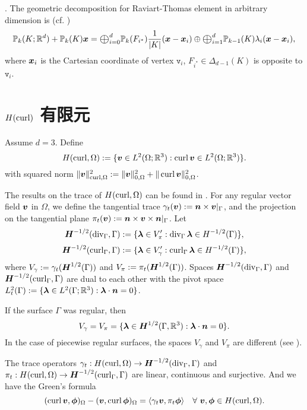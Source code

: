 .
The geometric decomposition for Raviart-Thomas element in arbitrary dimension is (cf. \cite{ArnoldFalkWinther2009})
$$
\mathbb P_k(K;\mathbb R^d)+\mathbb P_k(K)\bs x=\Oplus_{i=0}^d\mathbb P_{k}(F_{i^*})\frac{1}{|K|}(\bs x-\bs x_i) \oplus \Oplus_{i=1}^d\mathbb P_{k-1}(K)\lambda_i(\bs x-\bs x_i),
$$
where $\boldsymbol x_i$ is the Cartesian coordinate of vertex $\texttt{v}_i$, $F_{i^*}\in\Delta_{d-1}(K)$ is opposite to $\texttt{v}_i$.



\section{$H(\operatorname{curl})$ 有限元}

Assume $d=3$.
Define
\[
H(\operatorname{curl},\Omega):=\{\boldsymbol v\in L^2(\Omega;\mathbb R^3): \operatorname{curl}\boldsymbol v\in L^2(\Omega;\mathbb R^3)\}.
\]
with squared  norm $\|\boldsymbol v\|_{\operatorname{curl}, \Omega}^2:=\|\boldsymbol v\|_{0, \Omega}^2+\|\operatorname{curl}\boldsymbol v\|_{0, \Omega}^2$.

The results on the trace of $H(\operatorname{curl},\Omega)$ can be found in \cite{BuffaCostabelSheen2002,BuffaCiarlet2001,BuffaCiarlet2001a}.
 For any regular vector field $\boldsymbol v$ in $\Omega$, we define the tangential trace $\gamma_{t}(\boldsymbol v):=\boldsymbol n\times \boldsymbol v|_{\Gamma}$, and the projection on the tangential plane $\pi_{t}(\boldsymbol v):=\boldsymbol n\times\boldsymbol v\times  \boldsymbol n|_{\Gamma}$. Let
 \[
 \boldsymbol H^{-1/2}(\operatorname{div}_{\Gamma}, \Gamma):=\{\boldsymbol\lambda\in V_{\pi}': \operatorname{div}_{\Gamma}\boldsymbol\lambda\in H^{-1/2}(\Gamma)\},
 \]
 \[
 \boldsymbol H^{-1/2}(\operatorname{curl}_{\Gamma}, \Gamma):=\{\boldsymbol\lambda\in V_{\gamma}': \operatorname{curl}_{\Gamma}\boldsymbol\lambda\in H^{-1/2}(\Gamma)\},
 \]
 where $V_{\gamma}:=\gamma_{t}(\boldsymbol H^{1/2}(\Gamma))$ and $V_{\pi}:=\pi_{t}(\boldsymbol H^{1/2}(\Gamma))$.
Spaces $ \boldsymbol H^{-1/2}(\operatorname{div}_{\Gamma}, \Gamma)$ and $ \boldsymbol H^{-1/2}(\operatorname{curl}_{\Gamma}, \Gamma)$ are dual to each other with the pivot space $L_t^2(\Gamma):=\{\boldsymbol \lambda\in L^2(\Gamma;\mathbb R^3): \boldsymbol \lambda\cdot\boldsymbol n=0\}$.

If the surface $\Gamma$ was regular, then
\[
V_{\gamma}=V_{\pi}=\{\boldsymbol\lambda\in\boldsymbol H^{1/2}(\Gamma, \mathbb R^3): \boldsymbol\lambda\cdot\boldsymbol n=0\}.
\]
In the case of piecewise regular surfaces, the spaces $V_{\gamma}$ and $V_{\pi}$ are different (see \cite{BuffaCiarlet2001}).

\begin{lemma}
The trace operators $\gamma_{t}:  H(\operatorname{curl},\Omega)\to\boldsymbol H^{-1/2}(\operatorname{div}_{\Gamma}, \Gamma)$ and $\pi_{t}:  H(\operatorname{curl},\Omega)\to\boldsymbol H^{-1/2}(\operatorname{curl}_{\Gamma}, \Gamma)$ are linear, continuous and surjective. And we have the 
Green's formula
\[
(\operatorname{curl}\boldsymbol v, \boldsymbol\phi)_{\Omega} - (\boldsymbol v, \operatorname{curl}\boldsymbol\phi)_{\Omega}=\langle\gamma_t\boldsymbol v, \pi_t\boldsymbol \phi\rangle\quad\forall~\boldsymbol v, \boldsymbol \phi\in H(\operatorname{curl},\Omega).
\]
\end{lemma}

